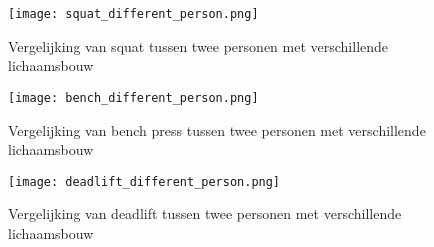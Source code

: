 \begin{figure}[h]
\centering
\texttt{[image: squat\_different\_person.png]}
\caption{Vergelijking van squat tussen twee personen met verschillende lichaamsbouw}
\label{fig:squat_diff_person}
\end{figure}

\begin{figure}[h]
\centering
\texttt{[image: bench\_different\_person.png]}
\caption{Vergelijking van bench press tussen twee personen met verschillende lichaamsbouw}
\label{fig:bench_diff_person}
\end{figure}

\begin{figure}[h]
\centering
\texttt{[image: deadlift\_different\_person.png]}
\caption{Vergelijking van deadlift tussen twee personen met verschillende lichaamsbouw}
\label{fig:deadlift_diff_person}
\end{figure}


